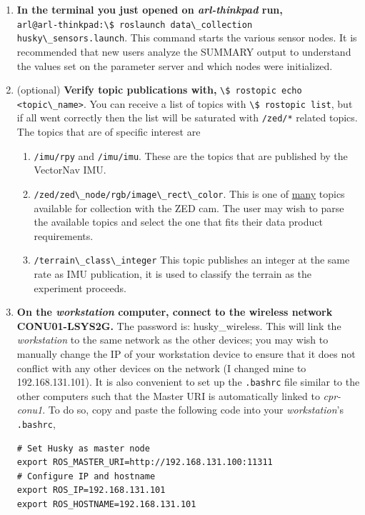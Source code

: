 \documentclass[
	12pt, %
]{fphw}
\newcommand{\code}[1]{\colorbox{light-gray}{\lstinline|#1|}}
\begin{document}
\begin{enumerate}
\item \textbf{In the terminal you just opened on \emph{arl-thinkpad} run,} \\ \code{arl@arl-thinkpad:\$ roslaunch data\_collection husky\_sensors.launch}. This command starts the various sensor nodes. It is recommended that new users analyze the SUMMARY output to understand the values set on the parameter server and which nodes were initialized.

\item (optional) \textbf{Verify topic publications with,} \code{\$ rostopic echo <topic\_name>}. You can receive a list of topics with \code{\$ rostopic list}, but if all went correctly then the list will be saturated with \code{/zed/*} related topics. The topics that are of specific interest are
\begin{enumerate}
	\item \code{/imu/rpy} and \code{/imu/imu}. These are the topics that are published by the VectorNav IMU.
	\item \code{/zed/zed\_node/rgb/image\_rect\_color}. This is one of \underline{many} topics available for collection with the ZED cam. The user may wish to parse the available topics and select the one that fits their data product requirements.
	\item \code{/terrain\_class\_integer} This topic publishes an integer at the same rate as IMU publication, it is used to classify the terrain as the experiment proceeds.
\end{enumerate}

\item \textbf{On the \emph{workstation} computer, connect to the wireless network CONU01-LSYS2G.} The password is: husky\_wireless. This will link the \emph{workstation} to the same network as the other devices; you may wish to manually change the IP of your workstation device to ensure that it does not conflict with any other devices on the network (I changed mine to 192.168.131.101). It is also convenient to set up the \code{.bashrc} file similar to the other computers such that the Master URI is automatically linked to \emph{cpr-conu1}. To do so, copy and paste the following code into your \emph{workstation}'s \code{.bashrc},

\begin{lstlisting}
# Set Husky as master node
export ROS_MASTER_URI=http://192.168.131.100:11311
# Configure IP and hostname
export ROS_IP=192.168.131.101
export ROS_HOSTNAME=192.168.131.101
\end{lstlisting}


\end{enumerate}
\end{document}
